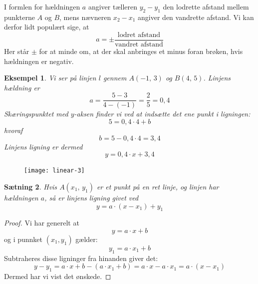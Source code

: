 \documentclass[12pt,oneside,a4paper]{article}
\newtheorem{thm}{Sætning}[section]
\newtheorem{eks}[thm]{Eksempel}
\begin{document}
I formlen for hældningen $a$ angiver tælleren $y_2-y_1$ den lodrette afstand
mellem punkterne $A$ og $B$, mens nævneren $x_2-x_1$ angiver den vandrette
afstand. Vi kan derfor lidt populært sige, at
$$
a = \pm \frac{\mbox{lodret afstand}}{\mbox{vandret afstand}}
$$
Her står $\pm$ for at minde om, at der skal anbringes et minus foran brøken,
hvis hældningen er negativ.
\begin{eks}
    Vi ser på linjen $l$ gennem $A(-1,\,3)$ og $B(4,\,5)$.
    Linjens hældning er
    $$
    a = \frac{5-3}{4-(-1)} = \frac{2}{5} = 0,4
    $$
    Skæringspunktet med $y$-aksen finder vi ved at indsætte det ene punkt i ligningen:
    $$
    5 = 0,4\cdot 4 + b
    $$
    hvoraf
    $$
    b = 5 - 0,4\cdot 4 = 3,4
    $$
    Linjens ligning er dermed
    $$
    y = 0,4 \cdot x + 3,4 
    $$
\end{eks}
\begin{figure}[ht]
    \centering
    \texttt{[image: linear-3]}
    \label{linear-3}
\end{figure}



\begin{thm}
    Hvis $A(x_1,\,y_1)$ er et punkt på en ret linje, og linjen har hældningen
    $a$, så er linjens ligning givet ved
    $$
    y = a\cdot (x-x_1) + y_1 
    $$
\end{thm}
\begin{proof}
    Vi har generelt at 
    $$
    y = a\cdot x + b
    $$
    og i punnket $(x_1, y_1)$ gælder:
    $$
    y_1 = a\cdot x_1 + b
    $$
    Subtraheres disse ligninger fra hinanden giver det:
    $$
    y-y_1 = a \cdot x + b - (a \cdot x_1 + b) = a \cdot x - a \cdot x_1 = a \cdot (x - x_1)
    $$
    Dermed har vi vist det ønskede.
\end{proof}
\end{document}
